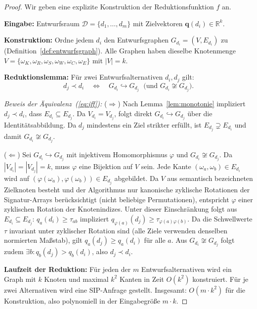 ﻿\documentclass[a4paper,12pt]{article}
\theoremstyle{definition}
\begin{document}
\begin{proof}
Wir geben eine explizite Konstruktion der Reduktionsfunktion $f$ an.

\textbf{Eingabe:} Entwurfsraum $\mathcal{D} = \{d_1, \ldots, d_m\}$ mit
Zielvektoren $\mathbf{q}(d_i) \in \mathbb{R}^k$.

\textbf{Konstruktion:} Ordne jedem $d_i$ den Entwurfsgraphen
$G_{d_i} = (V, E_{d_i})$ zu (Definition~\ref{def:entwurfsgraph}).
Alle Graphen haben dieselbe Knotenmenge $V = \{\omega_K, \omega_R, \omega_S,
\omega_W, \omega_C, \omega_E\}$ mit $|V| = k$.

\textbf{Reduktionslemma:}
F\"{u}r zwei Entwurfsalternativen $d_i, d_j$ gilt:
\begin{equation}\label{eq:iff}
    d_j \prec d_i
    \quad\iff\quad
    G_{d_i} \hookrightarrow G_{d_j}
    \;\text{ (und } G_{d_i} \not\cong G_{d_j}\text{)}.
\end{equation}

\emph{Beweis der \"{A}quivalenz~(\ref{eq:iff}):}
($\Rightarrow$) Nach Lemma~\ref{lem:monotonie} impliziert $d_j \prec d_i$,
dass $E_{d_i} \subseteq E_{d_j}$. Da $V_{d_i} = V_{d_j}$, folgt direkt
$G_{d_i} \hookrightarrow G_{d_j}$ \"{u}ber die Identit\"{a}tsabbildung.
Da $d_j$ mindestens ein Ziel strikter erf\"{u}llt, ist $E_{d_j} \supsetneq E_{d_i}$
und damit $G_{d_i} \not\cong G_{d_j}$.

($\Leftarrow$) Sei $G_{d_i} \hookrightarrow G_{d_j}$ mit injektivem
Homomorphismus $\varphi$ und $G_{d_i} \not\cong G_{d_j}$.
Da $|V_{d_i}| = |V_{d_j}| = k$, muss $\varphi$ eine Bijektion auf $V$ sein.
Jede Kante $(\omega_a, \omega_b) \in E_{d_i}$ wird auf
$(\varphi(\omega_a), \varphi(\omega_b)) \in E_{d_j}$ abgebildet.
Da $V$ aus semantisch bezeichneten Zielknoten besteht und der Algorithmus
nur kanonische zyklische Rotationen der Signatur-Arrays ber\"{u}cksichtigt
(nicht beliebige Permutationen), entspricht $\varphi$ einer zyklischen
Rotation der Knotenindizes.
Unter dieser Einschr\"{a}nkung folgt aus $E_{d_i} \subseteq E_{d_j}$:
$q_a(d_i) \geq \tau_{ab}$ impliziert $q_{\varphi(a)}(d_j) \geq \tau_{\varphi(a)\varphi(b)}$.
Da die Schwellwerte $\tau$ invariant unter zyklischer Rotation sind
(alle Ziele verwenden denselben normierten Ma{\ss}stab), gilt
$q_a(d_j) \geq q_a(d_i)$ f\"{u}r alle $a$.
Aus $G_{d_i} \not\cong G_{d_j}$ folgt zudem $\exists b: q_b(d_j) > q_b(d_i)$,
also $d_j \prec d_i$.

\textbf{Laufzeit der Reduktion:}
F\"{u}r jeden der $m$ Entwurfsalternativen wird ein Graph mit $k$ Knoten und
maximal $k^2$ Kanten in Zeit $O(k^2)$ konstruiert.
F\"{u}r je zwei Alternativen wird eine SIP-Anfrage gestellt.
Insgesamt: $O(m \cdot k^2)$ f\"{u}r die Konstruktion, also polynomiell in der
Eingabegr\"{o}{\ss}e $m \cdot k$.
\end{proof}
\end{document}
